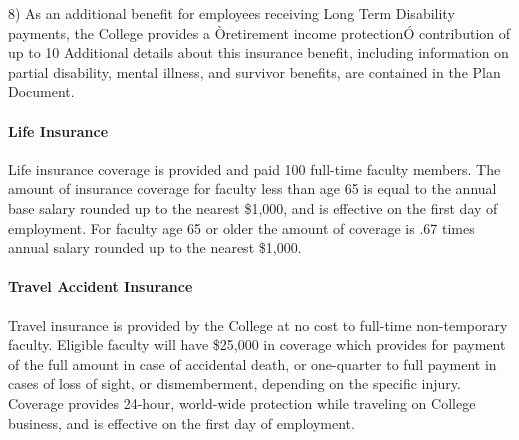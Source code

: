 \documentclass[letterpaper, 11pt]{article}
\begin{document}
\begin{enumerate}[label=\alph*)]
					8) As an additional benefit for employees receiving Long Term Disability payments, the College provides a Òretirement income protectionÓ contribution of up to 10%
					Additional details about this insurance benefit, including information on partial disability, mental illness, and survivor benefits, are contained in the Plan Document.
				\end{enumerate}
			\paragraph{Life Insurance}
				Life insurance coverage is provided and paid 100%
				full-time faculty members.  The amount of insurance coverage for faculty less
				than age 65 is equal to the annual base salary rounded up to the nearest
				\$1,000, and is effective on the first day of employment.  For faculty age 65
				or older the amount of coverage is .67 times annual salary rounded up to the
				nearest \$1,000.
			\paragraph{Travel Accident Insurance}
				Travel insurance is provided by the College at no cost to full-time
				non-temporary faculty.  Eligible faculty will have \$25,000 in coverage which provides for payment of the full amount in case of accidental death, or one-quarter to full payment in cases of loss of sight, or dismemberment, depending on the specific injury.  Coverage provides 24-hour, world-wide protection while traveling on College business, and is effective on the first day of employment.
\end{document}

